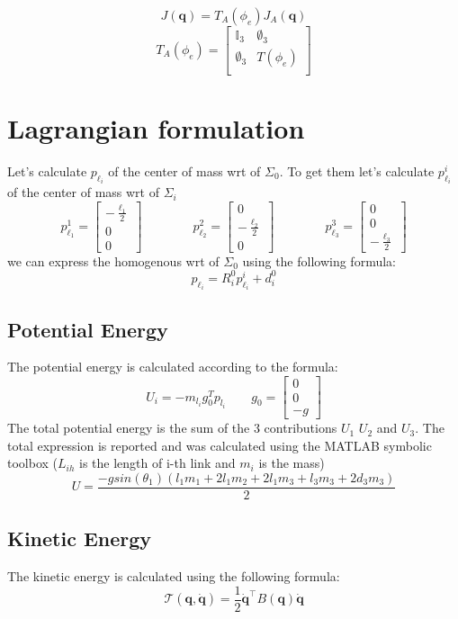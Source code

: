 \documentclass[a4paper,12pt]{article}
\renewcommand*{\l}{\ell}
\newcommand*{\T}{^\top}
\newcommand*{\I}{\mathbb{I}}
\newcommand*{\q}{\bm{q}}
\newcommand*{\dotq}{\dot{\q}}
\begin{document}
\[
J(\q) = T_A(\phi_e) J_A(\q)
\]
\[
T_A(\phi_e) = \begin{bmatrix}
    \I_3 & \emptyset_3 \\ 
\emptyset_3 &     T(\phi_e) \\
\end{bmatrix}
\]

\section{Lagrangian formulation}
Let's calculate $p_{\l_i}$ of the center of mass wrt of $\Sigma_0$. To get them let's calculate $p^i_{\l_i}$ of the center of mass wrt of $\Sigma_i$
\[
p_{\l_1}^{1} = \begin{bmatrix}  - \frac{\l_1}{2} \\ 0 \\ 0 \end{bmatrix}
\qquad
\qquad
p_{\l_2}^{2} = \begin{bmatrix} 0 \\ - \frac{\l_2}{2} \\ 0 \end{bmatrix}
\qquad
\qquad
p_{\l_3}^{3} = \begin{bmatrix} 0 \\ 0 \\  - \frac{\l_3}{2} \end{bmatrix}
\]
we can express the homogenous wrt of $\Sigma_0$ using the following formula: 
\[
p_{\l_i} = R^0_i p_{\l_i}^{i}  +  d^0_i
\] 

\subsection{Potential Energy}
The potential energy is calculated according to the formula:
\[
    U_i = -m_{l_i}g_0^{T}p_{l_i}
    \qquad
    g_0 = \begin{bmatrix}
        0\\ 0 \\ -g
    \end{bmatrix}
\]
\noindent The total potential energy is the sum of the 3 contributions $U_1$ $U_2$ and $U_3$. The total expression is reported and was calculated using the MATLAB symbolic toolbox ($L_{ih}$ is the length of i-th link and $m_i$ is the mass)
\[
    U = \frac{-gsin(\theta_1)(l_{1}m_1 + 2l_{1}m_2 + 2l_{1}m_3 + l_{3}m_3 + 2d_3m_3)}{2}  
\]

\subsection{Kinetic Energy}
The kinetic energy is calculated using the following formula:
\[
\mathcal{T}(\q,\dotq) = \frac{1}{2}\dotq\T B(\q) \dotq
\]
\end{document}
